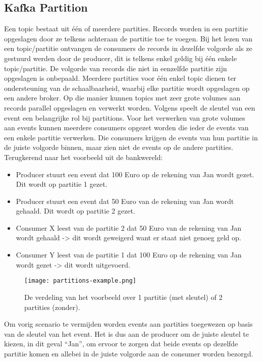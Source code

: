 \subsection{Kafka Partition}
Een topic bestaat uit \'e\'en of meerdere partities. Records worden in een partitie opgeslagen door ze telkens achteraan de partitie toe te voegen. Bij het lezen van een topic/partitie ontvangen de consumers de records in dezelfde volgorde als ze gestuurd werden door de producer, dit is telkens enkel geldig bij één enkele topic/partitie. De volgorde van records die niet in eenzelfde partitie zijn opgeslagen is onbepaald.
Meerdere partities voor \'e\'en enkel topic dienen ter ondersteuning van de schaalbaarheid, waarbij elke partitie wordt opgeslagen op een andere broker. Op die manier kunnen topics met zeer grote volumes aan records parallel opgeslagen en verwerkt worden.
\newline
\newline
Volgens \textcite{Harbour2023} speelt de sleutel van een event een belangrijke rol bij partitions. Voor het verwerken van grote volumes aan events kunnen meerdere consumers opgezet worden die ieder de events van een enkele partitie verwerken. Die consumers krijgen de events van hun partitie in de juiste volgorde binnen, maar zien niet de events op de andere partities. Terugkerend naar het voorbeeld uit de bankwereld:
\begin{itemize}
    \item Producer stuurt een event dat 100 Euro op de rekening van Jan wordt gezet. Dit wordt op partitie 1 gezet.
    \item Producer stuurt een event dat 50 Euro van de rekening van Jan wordt gehaald. Dit wordt op partitie 2 gezet.
    \item Consumer X leest van de partitie 2 dat 50 Euro van de rekening van Jan wordt gehaald -> dit wordt geweigerd want er staat niet genoeg geld op.
    \item Consumer Y leest van de partitie 1 dat 100 Euro op de rekening van Jan wordt gezet -> dit wordt uitgevoerd.
\end{itemize}

\begin{figure}[H]
    \texttt{[image: partitions-example.png]}
    \caption{De verdeling van het voorbeeld over 1 partitie (met sleutel) of 2 partities (zonder).}
\end{figure}

Om vorig scenario te vermijden worden events aan partities toegewezen op basis van de sleutel van het event. Het is dus aan de producer om de juiste sleutel te kiezen, in dit geval ``Jan'', om ervoor te zorgen dat beide events op dezelfde partitie komen en allebei in de juiste volgorde aan de consumer worden bezorgd.
\newline
\newline


